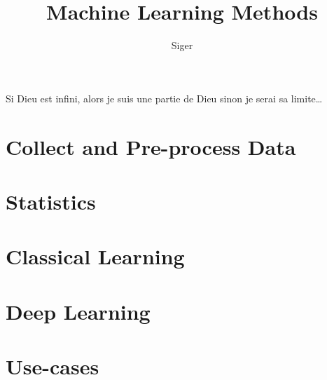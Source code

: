 \documentclass[a4paper, 10pt]{report}
\title{Machine Learning Methods}
\author{Siger}
\begin{document}
\maketitle

Si Dieu est infini, alors je suis une partie de Dieu sinon je serai sa limite\ldots


\tableofcontents

\chapter{Collect and Pre-process Data}

\chapter{Statistics}

\chapter{Classical Learning}

\chapter{Deep Learning}
\chapter{Use-cases}

\printbibliography
\end{document}
